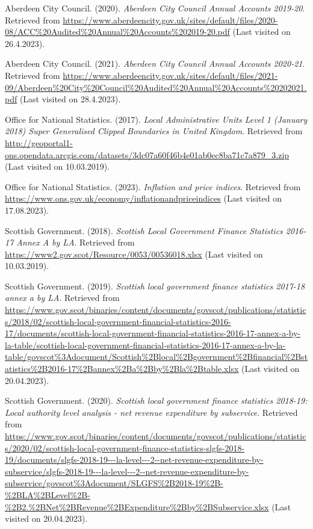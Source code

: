 \documentclass[
  12pt,
]{article}
\newlength{\cslhangindent}
\newlength{\cslentryspacingunit} %
\newenvironment{CSLReferences}[2] %
 {%
  \setlength{\parindent}{0pt}
  \ifodd #1
  \let\oldpar\par
  \def\par{\hangindent=\cslhangindent\oldpar}
  \fi
  \setlength{\parskip}{#2\cslentryspacingunit}
 }%
 {}
\begin{document}
\hypertarget{refs}{}
\begin{CSLReferences}{1}{0}
\leavevmode{}%
Aberdeen City Council. (2020). \emph{{Aberdeen City Council Annual Accounts 2019-20}}. Retrieved from \url{https://www.aberdeencity.gov.uk/sites/default/files/2020-08/ACC\%20Audited\%20Annual\%20Accounts\%202019-20.pdf} (Last visited on 26.4.2023).

\leavevmode{}%
Aberdeen City Council. (2021). \emph{{Aberdeen City Council Annual Accounts 2020-21}}. Retrieved from \url{https://www.aberdeencity.gov.uk/sites/default/files/2021-09/Aberdeen\%20City\%20Council\%20Audited\%20Annual\%20Accounts\%20202021.pdf} (Last visited on 28.4.2023).

\leavevmode{}%
Office for National Statistics. (2017). \emph{{Local Administrative Units Level 1 (January 2018) Super Generalised Clipped Boundaries in United Kingdom}}. Retrieved from \url{http://geoportal1-ons.opendata.arcgis.com/datasets/3dc07a60f46b4e01ab0ec8ba71c7a879_3.zip} (Last visited on 10.03.2019).

\leavevmode{}%
Office for National Statistics. (2023). \emph{{Inflation and price indices}}. Retrieved from \url{https://www.ons.gov.uk/economy/inflationandpriceindices} (Last visited on 17.08.2023).

\leavevmode{}%
Scottish Government. (2018). \emph{{Scottish Local Government Finance Statistics 2016-17 Annex A by LA}}. Retrieved from \url{https://www2.gov.scot/Resource/0053/00536018.xlsx} (Last visited on 10.03.2019).

\leavevmode{}%
Scottish Government. (2019). \emph{Scottish local government finance statistics 2017-18 annex a by LA}. Retrieved from \url{https://www.gov.scot/binaries/content/documents/govscot/publications/statistics/2018/02/scottish-local-government-financial-statistics-2016-17/documents/scottish-local-government-financial-statistics-2016-17-annex-a-by-la-table/scottish-local-government-financial-statistics-2016-17-annex-a-by-la-table/govscot\%3Adocument/Scottish\%2Blocal\%2Bgovernment\%2Bfinancial\%2Bstatistics\%2B2016-17\%2Bannex\%2Ba\%2Bby\%2Bla\%2Btable.xlsx} (Last visited on 20.04.2023).

\leavevmode{}%
Scottish Government. (2020). \emph{Scottish local government finance statistics 2018-19: Local authority level analysis - net revenue expenditure by subservice}. Retrieved from \url{https://www.gov.scot/binaries/content/documents/govscot/publications/statistics/2020/02/scottish-local-government-finance-statistics-slgfs-2018-19/documents/slgfs-2018-19---la-level---2--net-revenue-expenditure-by-subservice/slgfs-2018-19---la-level---2--net-revenue-expenditure-by-subservice/govscot\%3Adocument/SLGFS\%2B2018-19\%2B-\%2BLA\%2BLevel\%2B-\%2B2.\%2BNet\%2BRevenue\%2BExpenditure\%2Bby\%2BSubservice.xlsx} (Last visited on 20.04.2023).


\end{CSLReferences}
\end{document}
